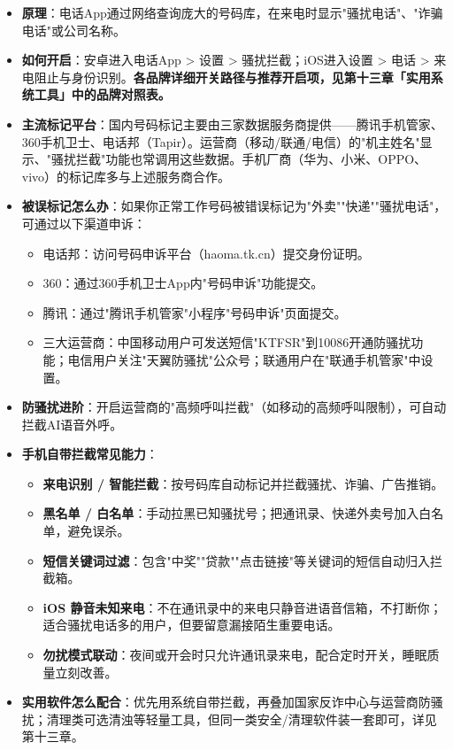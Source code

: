 \begin{itemize}
  \item \textbf{原理}：电话App通过网络查询庞大的号码库，在来电时显示"骚扰电话"、"诈骗电话"或公司名称。
  \item \textbf{如何开启}：安卓进入电话App > 设置 > 骚扰拦截；iOS进入设置 > 电话 > 来电阻止与身份识别。\textbf{各品牌详细开关路径与推荐开启项，见第十三章「实用系统工具」中的品牌对照表。}
  \item \textbf{主流标记平台}：国内号码标记主要由三家数据服务商提供——腾讯手机管家、360手机卫士、电话邦（Tapir）。运营商（移动/联通/电信）的"机主姓名"显示、"骚扰拦截"功能也常调用这些数据。手机厂商（华为、小米、OPPO、vivo）的标记库多与上述服务商合作。
  \item \textbf{被误标记怎么办}：如果你正常工作号码被错误标记为"外卖""快递""骚扰电话"，可通过以下渠道申诉：
  \begin{itemize}
    \item 电话邦：访问号码申诉平台（haoma.tk.cn）提交身份证明。
    \item 360：通过360手机卫士App内"号码申诉"功能提交。
    \item 腾讯：通过"腾讯手机管家"小程序"号码申诉"页面提交。
    \item 三大运营商：中国移动用户可发送短信"KTFSR"到10086开通防骚扰功能；电信用户关注"天翼防骚扰"公众号；联通用户在"联通手机管家"中设置。
  \end{itemize}
  \item \textbf{防骚扰进阶}：开启运营商的"高频呼叫拦截"（如移动的高频呼叫限制），可自动拦截AI语音外呼。
  \item \textbf{手机自带拦截常见能力}：
  \begin{itemize}
    \item \textbf{来电识别 / 智能拦截}：按号码库自动标记并拦截骚扰、诈骗、广告推销。
    \item \textbf{黑名单 / 白名单}：手动拉黑已知骚扰号；把通讯录、快递外卖号加入白名单，避免误杀。
    \item \textbf{短信关键词过滤}：包含"中奖""贷款""点击链接"等关键词的短信自动归入拦截箱。
    \item \textbf{iOS 静音未知来电}：不在通讯录中的来电只静音进语音信箱，不打断你；适合骚扰电话多的用户，但要留意漏接陌生重要电话。
    \item \textbf{勿扰模式联动}：夜间或开会时只允许通讯录来电，配合定时开关，睡眠质量立刻改善。
  \end{itemize}
  \item \textbf{实用软件怎么配合}：优先用系统自带拦截，再叠加国家反诈中心与运营商防骚扰；清理类可选清浊等轻量工具，但同一类安全/清理软件装一套即可，详见第十三章。
\end{itemize}

